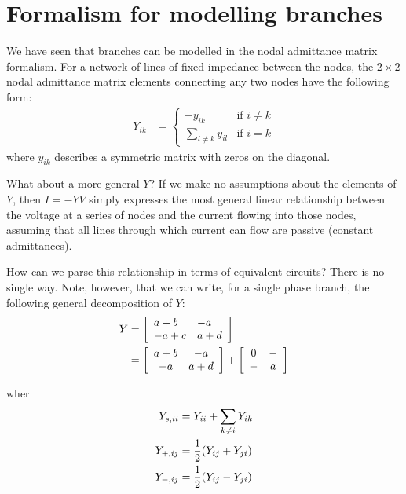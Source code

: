 \documentclass[11pt]{article}
\begin{document}
\section{Formalism for modelling branches}
We have seen that branches can be modelled in the nodal admittance matrix formalism. For a network of lines of fixed impedance between the nodes, the  $2 \times 2$ nodal admittance matrix elements connecting any two nodes have the following form:
\begin{align}
	Y_{ik} &= 
		\begin{cases}
			-y_{ik}&\text{if $i \ne k$} \\
			\sum_{l \ne k} y_{il}& \text{if $i = k$}
		\end{cases}
\end{align}
where $y_{ik}$ describes a symmetric matrix with zeros on the diagonal.

What about a more general $Y$? If we make no assumptions about the elements of $Y$, then $I = -YV$ simply expresses the most general linear relationship between the voltage at a series of nodes and the current flowing into those nodes, assuming that all lines through which current can flow are passive (constant admittances).

How can we parse this relationship in terms of equivalent circuits? There is no single way. Note, however, that we can write, for a single phase branch, the following general decomposition of $Y$:
\begin{align}
	Y &= \left[
		\begin{array}{ll}
			a + b & -a \\
			-a + c & a + d
		\end{array}
	\right] \notag \\
	&= \left[
		\begin{array}{cc}
			a + b & -a \\
			-a & a + d
		\end{array}
	\right] +
	\left[
		\begin{array}{cc}
			0 & - \\
			- & a
		\end{array}
	\right]
\end{align}

wher
\begin{align}
Y_{s,ii} &= Y_{ii} + \sum_{k \ne i} Y_{ik} \notag \\
Y_{+,ij} &= \frac{1}{2}(Y_{ij} + Y_{ji}) \notag \\
Y_{-,ij} &= \frac{1}{2}(Y_{ij} - Y_{ji}) \\
\end{align}
\end{document}
